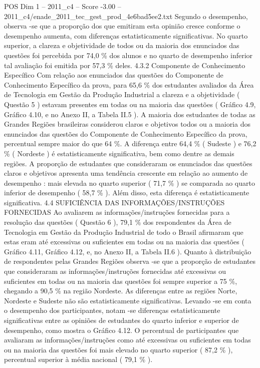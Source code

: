 \begin{textsample}{POS Dim 1 – 2011\_c4 – Score -3.00 – 2011\_c4/enade\_2011\_tec\_gest\_prod\_4e6bad5ee2.txt}
Segundo o desempenho, observa -se que a proporção dos que emitiram esta opinião cresce conforme o desempenho aumenta, com diferenças estatisticamente significativas.
No quarto superior, a clareza e objetividade de todos ou da maioria dos enunciados das questões foi percebida por 74,0 \% dos alunos e no quarto de desempenho inferior tal avaliação foi emitida por 57,3 \% deles. 4.3.2 Componente de Conhecimento Específico Com relação aos enunciados das questões do Componente de Conhecimento Específico da prova, para 65,6 \% dos estudantes avaliados da Área de Tecnologia em Gestão da Produção Industrial a clareza e a objetividade ( Questão 5 ) estavam presentes em todas ou na maioria das questões ( Gráfico 4.9, Gráfico 4.10, e no Anexo II, a Tabela II.5 ).
A maioria dos estudantes de todas as Grandes Regiões brasileiras considerou claros e objetivos todos ou a maioria dos enunciados das questões do Componente de Conhecimento Específico da prova, percentual sempre maior do que 64 \%.
A diferença entre 64,4 \% ( Sudeste ) e 76,2 \% ( Nordeste ) é estatisticamente significativa, bem como dentre as demais regiões.
A proporção de estudantes que consideraram os enunciados das questões claros e objetivos apresenta uma tendência crescente em relação ao aumento de desempenho : mais elevada no quarto superior ( 71,7 \% ) se comparada ao quarto inferior de desempenho ( 58,7 \% ).
Além disso, esta diferença é estatisticamente significativa. 4.4 SUFICIÊNCIA DAS INFORMAÇÕES/INSTRUÇÕES FORNECIDAS Ao avaliarem as informações/instruções fornecidas para a resolução das questões ( Questão 6 ), 79,1 \% dos respondentes da Área de Tecnologia em Gestão da Produção Industrial de todo o Brasil afirmaram que estas eram até excessivas ou suficientes em todas ou na maioria das questões ( Gráfico 4.11, Gráfico 4.12, e, no Anexo II, a Tabela II.6 ).
Quanto à distribuição de respondentes pelas Grandes Regiões observa -se que a proporção de estudantes que consideraram as informações/instruções fornecidas até excessivas ou suficientes em todas ou na maioria das questões foi sempre superior a 75 \%, chegando a 90,5 \% na região Nordeste.
As diferenças entre as regiões Norte, Nordeste e Sudeste não são estatisticamente significativas.
Levando -se em conta o desempenho dos participantes, notam -se diferenças estatisticamente significativas entre as opiniões de estudantes do quarto inferior e superior de desempenho, como mostra o Gráfico 4.12.
O percentual de participantes que avaliaram as informações/instruções como até excessivas ou suficientes em todas ou na maioria das questões foi mais elevado no quarto superior ( 87,2 \% ), percentual superior à média nacional ( 79,1 \% ).

\end{textsample}
